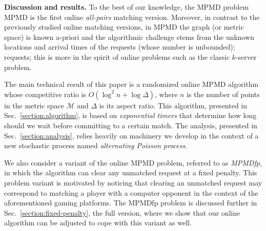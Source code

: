 \documentclass[11pt]{article}
\def\LongVersion{}
\def\LongVersionEnd{}
\def\ShortVersion{}
\def\ShortVersionEnd{}
\renewcommand{\paragraph}[1]{\par\noindent\textbf{#1}}
\theoremstyle{definition}
\theoremstyle{plain}
\theoremstyle{definition}
\theoremstyle{plain}
\theoremstyle{definition}
\theoremstyle{plain}
\newcommand{\Sect}{Sec.}
\begin{document}
\paragraph{Discussion and results.}
To the best of our knowledge,
\LongVersion %
the MPMD problem
\LongVersionEnd %
%
\ShortVersion %
MPMD
\ShortVersionEnd %
is the first online
\emph{all-pairs} matching version.
Moreover, in contrast to the previously studied online matching versions, in
MPMD the graph (or metric space) is known a-priori and the algorithmic
challenge stems from the unknown locations and arrival times of the
\LongVersion %
requests (whose number is unbounded);
\LongVersionEnd %
%
\ShortVersion %
requests;
\ShortVersionEnd %
this is more in the spirit of online problems such as the classic $k$-server
problem.

\ShortVersion \sloppy \ShortVersionEnd
The main
\LongVersion technical \LongVersionEnd
result of this paper is a randomized online MPMD algorithm
whose competitive ratio is
$O (\log^{2} n + \log \Delta)$,
where $n$ is the number of points in the metric space $\mathcal{M}$ and
$\Delta$ is its aspect ratio.
This algorithm, presented in \Sect{}~\ref{section:algorithm}, is based on
\emph{exponential timers} that determine how long should we wait before
committing to a certain match.
The analysis, presented in \Sect{}~\ref{section:analysis}, relies heavily on
machinery we develop in the context of a new stochastic process named
\emph{alternating Poisson process}.
\ShortVersion \par\fussy \ShortVersionEnd

We also consider a variant of the online MPMD problem, referred to as
\emph{MPMDfp}, in which the algorithm can clear any unmatched request at a
fixed penalty.
This problem variant is motivated by noticing that clearing an unmatched
request may correspond to matching a player with a computer opponent in the
context of the aforementioned gaming platforms.
The MPMDfp problem is discussed further in
\LongVersion %
\Sect{}~\ref{section:fixed-penalty},
\LongVersionEnd %
%
\ShortVersion %
the full version,
\ShortVersionEnd %
where we show that our online algorithm can be adjusted to cope with this
variant as well.
\end{document}
